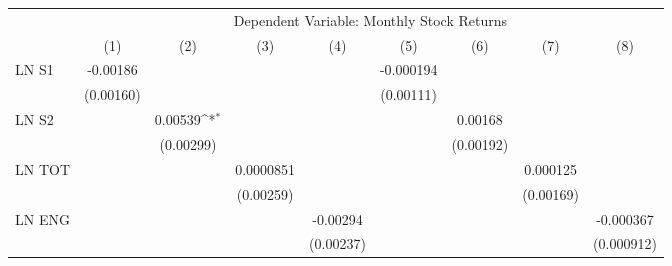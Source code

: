 {
\def\sym#1{\ifmmode^{#1}\else\(^{#1}\)\fi}
\begin{tabular}{l*{8}{c}}
\hline\hline
                    &\multicolumn{8}{c}{Dependent Variable: Monthly Stock Returns}                                                                                                                  \\\cmidrule(lr){2-9}
                    &\multicolumn{1}{c}{(1)}         &\multicolumn{1}{c}{(2)}         &\multicolumn{1}{c}{(3)}         &\multicolumn{1}{c}{(4)}         &\multicolumn{1}{c}{(5)}         &\multicolumn{1}{c}{(6)}         &\multicolumn{1}{c}{(7)}         &\multicolumn{1}{c}{(8)}         \\
\hline
LN S1               &    -0.00186         &                     &                     &                     &   -0.000194         &                     &                     &                     \\
                    &   (0.00160)         &                     &                     &                     &   (0.00111)         &                     &                     &                     \\
LN S2               &                     &     0.00539\sym{*}  &                     &                     &                     &     0.00168         &                     &                     \\
                    &                     &   (0.00299)         &                     &                     &                     &   (0.00192)         &                     &                     \\
LN TOT              &                     &                     &   0.0000851         &                     &                     &                     &    0.000125         &                     \\
                    &                     &                     &   (0.00259)         &                     &                     &                     &   (0.00169)         &                     \\
LN ENG              &                     &                     &                     &    -0.00294         &                     &                     &                     &   -0.000367         \\
                    &                     &                     &                     &   (0.00237)         &                     &                     &                     &  (0.000912)         \\

\end{tabular}}
